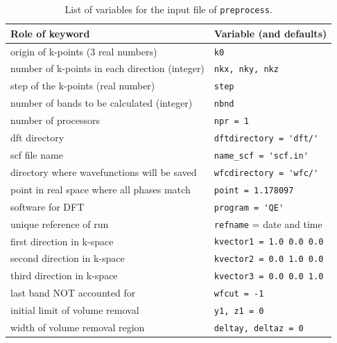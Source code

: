 \documentclass[a4paper,12pt]{report}
\begin{document}
\newpage

\begin{table}[h]
 \centering
 \caption{List of variables for the input file of \texttt{preprocess}.}

 \begin{tabularx}{\textwidth}{Xl}
 \textbf{Role of keyword}                     & \textbf{Variable (and defaults)}\\
\hline
 origin of k-points (3 real numbers)           & \verb|k0| \\
 number of k-points in each direction (integer)& \verb|nkx, nky, nkz| \\
 step of the k-points (real number)            & \verb|step| \\
 number of bands to be calculated (integer)    & \verb|nbnd| \\
 \hline
 number of processors                         & \verb|npr = 1| \\
 dft directory                                & \verb|dftdirectory = 'dft/'| \\
 scf file name                                & \verb|name_scf = 'scf.in'| \\
 directory where wavefunctions will be saved  & \verb|wfcdirectory = 'wfc/'| \\
 point in real space where all phases match   & \verb|point = 1.178097| \\
 software for DFT                             & \verb|program = 'QE'| \\
 unique reference of run                      & \verb|refname| = date and time \\
 first direction in k-space                   & \verb|kvector1 = 1.0 0.0 0.0| \\
 second direction in k-space                  & \verb|kvector2 = 0.0 1.0 0.0| \\
 third direction in k-space                   & \verb|kvector3 = 0.0 0.0 1.0| \\
 last band NOT accounted for                  & \verb|wfcut = -1| \\
 initial limit of volume removal              & \verb|y1, z1 = 0| \\
 width of volume removal region               & \verb|deltay, deltaz = 0| \\


 \hline
\end{tabularx}
 \label{tab:variables_preprocessing}
\end{table}
\end{document}
